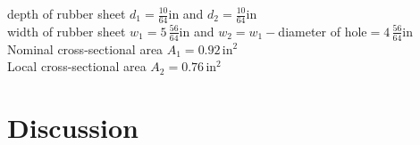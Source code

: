 \documentclass{article}
\begin{document}
depth of rubber sheet $d_1 = \frac{10}{64}$in and $d_2 = \frac{10}{64}$in \\

width of rubber sheet $w_1 = 5\,\frac{56}{64}$in and $w_2 = w_1 - $diameter of hole$ = 4\,\frac{56}{64}$in \\

Nominal cross-sectional area $A_1 = 0.92\,\text{in}^2$ \\

Local cross-sectional area $A_2 = 0.76\,\text{in}^2$ \\

\section{Discussion}
\end{document}
